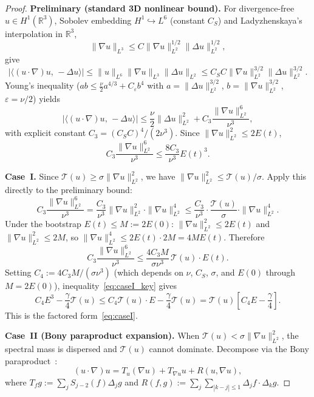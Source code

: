 \documentclass[12pt]{amsart}
\theoremstyle{remark}
\newcommand{\R}{\mathbb{R}}
\newcommand{\Tcal}{\mathcal{T}}
\newcommand{\ip}[2]{\langle #1,\, #2 \rangle}
\newcommand{\eps}{\varepsilon}
\begin{document}
\begin{proof}
\textbf{Preliminary (standard 3D nonlinear bound).}
For divergence-free $u\in H^1(\R^3)$, Sobolev embedding
$H^1\hookrightarrow L^6$ (constant $C_S$) and Ladyzhenskaya's
interpolation in $\R^3$,
\[
  \|\nabla u\|_{L^3}\le C\|\nabla u\|_{L^2}^{1/2}\|\Delta u\|_{L^2}^{1/2},
\]
give
\[
  |\ip{(u\cdot\nabla)u}{-\Delta u}|
  \le\|u\|_{L^6}\|\nabla u\|_{L^3}\|\Delta u\|_{L^2}
  \le C_SC\|\nabla u\|_{L^2}^{3/2}\|\Delta u\|_{L^2}^{3/2}.
\]
Young's inequality ($ab\le\frac{\nu}{2}a^{4/3}+C_\eps b^4$ with
$a=\|\Delta u\|_{L^2}^{3/2}$, $b=\|\nabla u\|_{L^2}^{3/2}$,
$\eps=\nu/2$) yields
\begin{equation}\label{eq:prelim}
  |\ip{(u\cdot\nabla)u}{-\Delta u}|
  \le\frac{\nu}{2}\|\Delta u\|_{L^2}^2
  +C_3\frac{\|\nabla u\|_{L^2}^6}{\nu^3},
\end{equation}
with explicit constant $C_3=(C_SC)^4/(2\nu^3)$.
Since $\|\nabla u\|_{L^2}^2\le 2E(t)$,
\begin{equation}\label{eq:C4raw}
  C_3\frac{\|\nabla u\|_{L^2}^6}{\nu^3}\le\frac{8C_3}{\nu^3}E(t)^3.
\end{equation}

\medskip\noindent\textbf{Case~I.}
Since $\Tcal(u)\ge\sigma\|\nabla u\|_{L^2}^2$, we have
$\|\nabla u\|_{L^2}^2\le\Tcal(u)/\sigma$.
Apply this directly to the preliminary bound:
\[
  C_3\frac{\|\nabla u\|_{L^2}^6}{\nu^3}
  = \frac{C_3}{\nu^3}\|\nabla u\|_{L^2}^2\cdot\|\nabla u\|_{L^2}^4
  \le \frac{C_3}{\nu^3}\cdot\frac{\Tcal(u)}{\sigma}
     \cdot\|\nabla u\|_{L^2}^4.
\]
Under the bootstrap $E(t)\le M:=2E(0)$:
$\|\nabla u\|_{L^2}^2\le 2E(t)$ and $\|\nabla u\|_{L^2}^2\le 2M$,
so $\|\nabla u\|_{L^2}^4\le 2E(t)\cdot 2M=4ME(t)$.
Therefore
\begin{equation}\label{eq:caseI_key}
  C_3\frac{\|\nabla u\|_{L^2}^6}{\nu^3}
  \le\frac{4C_3 M}{\sigma\nu^3}\,\Tcal(u)\cdot E(t).
\end{equation}
Setting $C_4:=4C_3M/(\sigma\nu^3)$ (which depends on $\nu$, $C_S$,
$\sigma$, and $E(0)$ through $M=2E(0)$), inequality~\eqref{eq:caseI_key}
gives
\[
  C_4 E^3 - \frac{\gamma}{4}\Tcal(u)
  \le C_4\Tcal(u)\cdot E - \frac{\gamma}{4}\Tcal(u)
  = \Tcal(u)\!\left[C_4 E - \frac{\gamma}{4}\right].
\]
This is the factored form~\eqref{eq:caseI}.

\medskip\noindent\textbf{Case~II (Bony paraproduct expansion).}
When $\Tcal(u)<\sigma\|\nabla u\|_{L^2}^2$, the spectral mass is
dispersed and $\Tcal(u)$ cannot dominate.  Decompose via the Bony
paraproduct~\cite{Bon81}:
\[
  (u\cdot\nabla)u = T_u(\nabla u)+T_{\nabla u}u+R(u,\nabla u),
\]
where $T_f g:=\sum_j S_{j-2}(f)\Delta_j g$ and
$R(f,g):=\sum_j\sum_{|k-j|\le 1}\Delta_j f\cdot\Delta_k g$.


\end{proof}
\end{document}
